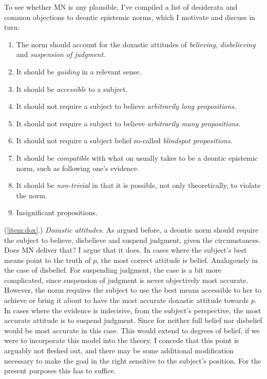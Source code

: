\documentclass[12pt,numbers=noenddot]{scrartcl}
\begin{document}
To see whether MN is any plausible, I've compiled a list of desiderata and common objections to deontic epistemic norms, which I motivate and discuss in turn:
\begin{enumerate}
    \itemsep-0.2em
    \item \label{item:dox} The norm should account for the doxastic attitudes of \emph{believing}, \emph{disbelieving} and \emph{suspension of judgment}.
    \item \label{item:guiding} It should be \emph{guiding} in a relevant sense.
    \item \label{item:accessible}It should be \emph{accessible} to a subject.
    \item \label{item:arbitrarilylong}It should not require a subject to believe \emph{arbitrarily long propositions}.
    \item \label{item:arbitrarilymany}It should not require a subject to believe \emph{arbitrarily many propositions}.
    \item \label{item:blindspot}It should not require a subject belief so-called \emph{blindspot propositions}.
    \item \label{item:compatible}It should be \emph{compatible} with what on usually takes to be a deontic epistemic norm, such as following one's evidence.
    \item \label{item:nontrivial}It should be \emph{non-trivial} in that it is possible, not only theoretically, to violate the norm.
    \item \label{item:insignificant} Insignificant propositions.
\end{enumerate}

(\ref{item:dox}.) \emph{Doxastic attitudes.} 
As argued before, a deontic norm should require the subject to believe, disbelieve and suspend judgment, given the circumstances. Does MN deliver that? I argue that it does. In cases where the subject's best means point to the truth of $p$, the most correct attitude is belief. Analogously in the case of disbelief. For suspending judgment, the case is a bit more complicated, since suspension of judgment is never objectively most accurate. However, the norm requires the subject to use the best means accessible to her to achieve or bring it about to have the most accurate doxastic attitude towards $p$. In cases where the evidence is indecisive, from the subject's perspective, the most accurate attitude is to suspend judgment. Since for neither full belief nor disbelief would be most accurate in this case. This would extend to degrees of belief, if we were to incorporate this model into the theory. I concede that this point is arguably not fleshed out, and there may be some additional modification necessary to make the goal in the right sensitive to the subject's position. For the present purposes this has to suffice.
\end{document}
